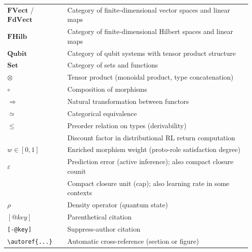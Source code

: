 \documentclass[
]{article}
\numberwithin{equation}{section}
\begin{document}
{\begin{longtable}[]{@{}
  >{\raggedright\arraybackslash}p{}
  >{\raggedright\arraybackslash}p{}@{}}
\(\mathbf{FVect}\) / \(\mathbf{FdVect}\) & Category of
finite-dimensional vector spaces and linear maps \\
\(\mathbf{FHilb}\) & Category of finite-dimensional Hilbert spaces and
linear maps \\
\(\mathbf{Qubit}\) & Category of qubit systems with tensor product
structure \\
\(\mathbf{Set}\) & Category of sets and functions \\
\(\otimes\) & Tensor product (monoidal product, type concatenation) \\
\(\circ\) & Composition of morphisms \\
\(\Rightarrow\) & Natural transformation between functors \\
\(\simeq\) & Categorical equivalence \\
\(\leq\) & Preorder relation on types (derivability) \\
\(\gamma) & Discount factor in distributional RL return computation \\
\(w \in [0,1]\) & Enriched morphism weight (proto-role satisfaction
degree) \\
\(\varepsilon\) & Prediction error (active inference); also compact
closure counit \\
\(\eta) & Compact closure unit (cap); also learning rate in some
contexts \\
\(\rho\) & Density operator (quantum state) \\
\([@key]\) & Parenthetical citation \\
\texttt{{[}-@key{]}} & Suppress-author citation \\
\texttt{\textbackslash{}autoref\{...\}} & Automatic cross-reference
(section or figure) \\
\end{longtable}
}




\end{document}

